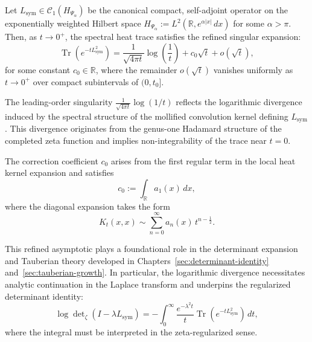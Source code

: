 \begin{proposition}
\label{prop:short_time_heat_expansion}
Let \( L_{\mathrm{sym}} \in \mathcal{C}_1(H_{\Psi_\alpha}) \) be the canonical compact, self-adjoint operator on the exponentially weighted Hilbert space \( H_{\Psi_\alpha} := L^2(\mathbb{R}, e^{\alpha |x|} \, dx) \) for some \( \alpha > \pi \). Then, as \( t \to 0^+ \), the spectral heat trace satisfies the refined singular expansion:
\[
\operatorname{Tr}\left(e^{-t L_{\mathrm{sym}}^2}\right)
= \frac{1}{\sqrt{4\pi t}} \log\left( \frac{1}{t} \right)
+ c_0 \sqrt{t} + o\left( \sqrt{t} \right),
\]
for some constant \( c_0 \in \mathbb{R} \), where the remainder \( o(\sqrt{t}) \) vanishes uniformly as \( t \to 0^+ \) over compact subintervals of \( (0, t_0] \).

\medskip
\noindent
The leading-order singularity \( \frac{1}{\sqrt{4\pi t}} \log(1/t) \) reflects the logarithmic divergence induced by the spectral structure of the mollified convolution kernel defining \( L_{\mathrm{sym}} \). This divergence originates from the genus-one Hadamard structure of the completed zeta function and implies non-integrability of the trace near \( t = 0 \).

\medskip
\noindent
The correction coefficient \( c_0 \) arises from the first regular term in the local heat kernel expansion and satisfies
\[
c_0 := \int_{\mathbb{R}} a_1(x) \, dx,
\]
where the diagonal expansion takes the form
\[
K_t(x,x) \sim \sum_{n=0}^{\infty} a_n(x)\, t^{n - \frac{1}{2}}.
\]

\medskip
\noindent
This refined asymptotic plays a foundational role in the determinant expansion and Tauberian theory developed in Chapters~\ref{sec:determinant-identity} and~\ref{sec:tauberian-growth}. In particular, the logarithmic divergence necessitates analytic continuation in the Laplace transform and underpins the regularized determinant identity:
\[
\log \det\nolimits_{\zeta}(I - \lambda L_{\mathrm{sym}}) = - \int_0^\infty \frac{e^{-\lambda^2 t}}{t} \operatorname{Tr}\left(e^{-t L_{\mathrm{sym}}^2} \right) \, dt,
\]
where the integral must be interpreted in the zeta-regularized sense.
\end{proposition}
